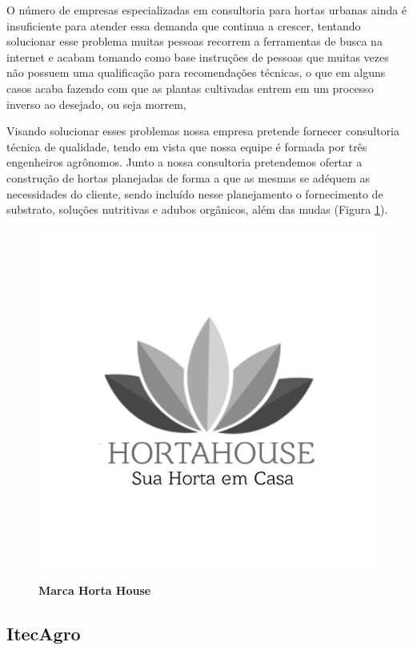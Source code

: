 O número de empresas especializadas em consultoria para hortas urbanas ainda é insuficiente para atender essa demanda que continua a crescer, tentando solucionar esse problema muitas pessoas recorrem a ferramentas de busca na internet e acabam tomando como base instruções de pessoas que muitas vezes não possuem uma qualificação para recomendações técnicas, o que em alguns casos acaba fazendo com que as plantas cultivadas entrem em um processo inverso ao desejado, ou seja morrem,

Visando solucionar esses problemas nossa empresa pretende fornecer consultoria técnica de qualidade, tendo em vista que nossa equipe é formada por três engenheiros agrônomos. Junto a nossa
consultoria pretendemos ofertar a construção de hortas planejadas de forma a que as mesmas se adéquem as necessidades do cliente, sendo incluído nesse planejamento o fornecimento de substrato, soluções nutritivas e adubos orgânicos, além das mudas (Figura \ref{figura_25}).


\begin{figure}[H]
\centering
\caption{\textbf{Marca Horta House}}
\includegraphics[scale=0.1]{Imagens/hortahouse.png}
\label{figura_25}
\end{figure}



\subsection{ItecAgro}

